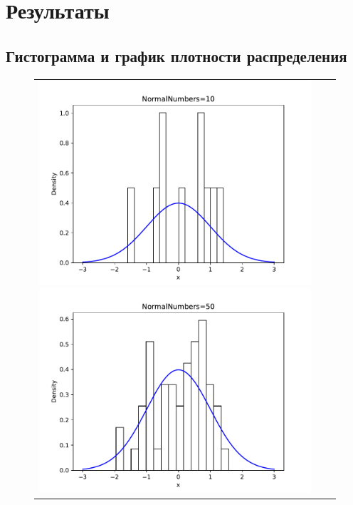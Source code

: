 \section{Результаты}

\subsection{Гистограмма и график плотности распределения}


\begin{figure}[H]
	\begin{tabular}{ccc}
		\includegraphics[scale=0.33]{normal_hist_10.pdf}
		\includegraphics[scale=0.33]{normal_hist_50.pdf}

\end{tabular}
\end{figure}
